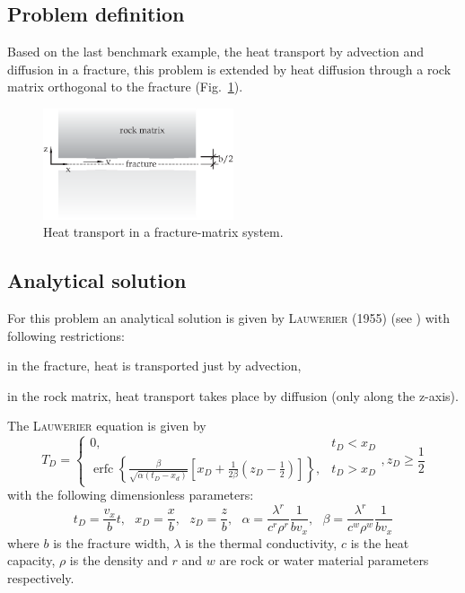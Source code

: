 \subsection{Problem definition}

Based on the last benchmark example, the heat transport by advection and diffusion in a fracture, this problem is extended by heat diffusion through a rock matrix orthogonal to the fracture (Fig.~\ref{fig-lauwerier-problem}). 
\begin{figure}[h]
\centering
\includegraphics[width=0.5\textwidth]{T/figures/lauwerier-problem.eps}
\caption{\label{fig-lauwerier-problem}Heat transport in a fracture-matrix system.}
\end{figure}
\subsection{Analytical solution}

For this problem an analytical solution is given by \textsc{Lauwerier} (1955) (see \cite{Kol:97}) with following restrictions:
\begin{compactitem}
\item in the fracture, heat is transported just by advection,
\item in the rock matrix, heat transport takes place by diffusion (only along the z-axis).
\end{compactitem}
The \textsc{Lauwerier} equation is given by
\begin{equation}
T_D=\begin{cases}
0, & t_D < x_D \\
\operatorname{erfc}\left\{ \frac{\beta}{\sqrt{\alpha\left(t_D-x_d\right)}} \left[ x_D+\frac{1}{2\beta}\left( z_D-\frac{1}{2} \right) \right]\right\}, & t_D > x_D
\end{cases},   z_D \geq\frac{1}{2}
\label{lauwerier}
\end{equation}
with the following dimensionless parameters:
\begin{equation}
t_D=\frac{v_x}{b}t,\ \ \ x_D=\frac{x}{b},\ \ \ z_D=\frac{z}{b},\ \ \ \alpha =\frac{\lambda ^{r}}{c^{r}\rho ^{r}}\frac{1}{bv_x},\ \ \ \beta = \frac{\lambda^{r}}{c^{w}\rho^{w}}\frac{1}{bv_x}
\end{equation}
where $b$ is the fracture width, $\lambda$ is the thermal conductivity, $c$ is the heat capacity, $\rho$ is the density and $r$ and $w$ are rock or water material parameters respectively.

